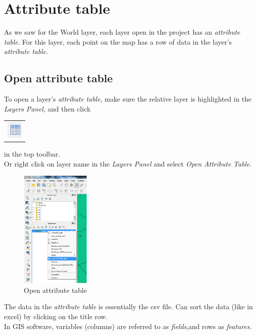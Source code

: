 \section{Attribute table}

As we saw for the World layer, each layer open in the project has an \textit{attribute table}. For this layer, each point on the map has a row of data in the layer's \textit{attribute table}.

\subsection{Open attribute table}

To open a layer's \textit{attribute table}, make sure the relative layer is highlighted in the \textit{Layers Panel}, and then click	\begin{tabular}{@{}c@{}}\includegraphics[width=4ex]{images/attribute_table_icon.png}\end{tabular}
in the top toolbar.\\
Or right click on layer name in the \textit{Layers Panel} and select \textit{Open Attribute Table}.

\begin{figure}[!h]
	\centering
	\includegraphics[width=0.3\textwidth]{images/right_click_layername.png}
	\caption{Open attribute table}
	\label{ft_fig_firstfig3}
\end{figure}

The data in the \textit{attribute table} is essentially the csv file. Can sort the data (like in excel) by clicking on the title row.\\
In GIS software, variables (columns) are referred to as \textit{fields},and rows as \textit{features}.\\

